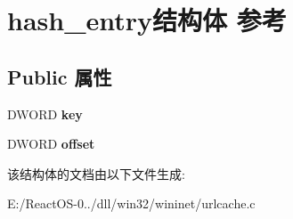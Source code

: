 \hypertarget{structhash__entry}{}\section{hash\+\_\+entry结构体 参考}
\label{structhash__entry}
\subsection*{Public 属性}
\begin{DoxyCompactItemize}
\item 
\mbox{\label{structhash__entry_a9aa03128093af7aaef4f2e85a41bdb93}} 
D\+W\+O\+RD {\bfseries key}
\item 
\mbox{\label{structhash__entry_a0e73113543c740b82ca76128a9c0a930}} 
D\+W\+O\+RD {\bfseries offset}
\end{DoxyCompactItemize}


该结构体的文档由以下文件生成\+:\begin{DoxyCompactItemize}
\item 
E\+:/\+React\+O\+S-\/0../dll/win32/wininet/urlcache.\+c\end{DoxyCompactItemize}
